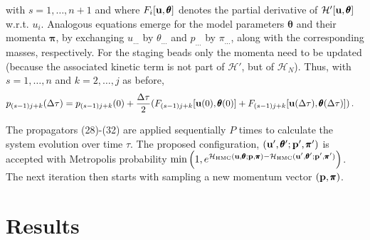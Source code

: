 \documentclass[11pt]{article}
\newcommand{\vc}[1]{{\bf #1 }}
\theoremstyle{definition}
\newcommand{\bt}{\pmb\theta}
\begin{document}
with $s=1,\dots,n+1$ and where $F_i[\vc u,{\pmb\theta}]$ denotes the partial derivative of $\mathcal H'[\vc u,{\pmb\theta}]$ w.r.t. $u_i$.
Analogous equations emerge for the model parameters $\bt$ and their momenta ${\pmb\pi}$, by exchanging $u_{…}$ by $\theta_{…}$ and $p_{…}$ by $\pi_{…}$, along with the corresponding masses, respectively. 
For the staging beads
only the momenta need to be updated (because the associated kinetic term is not part of $\mathcal H'$, but of $\mathcal H_N$).
Thus, with $s=1,\dots,n$ and $k=2,\dots,j$ as before,
\begin{align}
  p_{(s-1)j+k}(\Delta\tau)
  &=
  p_{(s-1)j+k}(0)
  +
  \frac{\Delta\tau}{2}
  (
  F_{(s-1)j+k}[\vc u(0),{\pmb\theta}(0)]
  +
  F_{(s-1)j+k}[\vc u(\Delta\tau),{\pmb\theta}(\Delta\tau)]
  )
  \,.
\end{align}
 
The propagators (28)-(32) are applied sequentially $P$ times to calculate the system evolution over time $\tau$. The proposed configuration, $(\vc u',\bt';\vc p',{\pmb\pi}')$ is accepted with Metropolis probability $  \min
  \left(
    1,
    e^{\mathcal{H}_{\mbox{\tiny HMC}}(\vc u,\bt;\vc p,{\pmb\pi}) - \mathcal{H}_{\mbox{\tiny HMC}}(\vc u',\bt';\vc p',{\pmb\pi}')}
  \right)$.
The next iteration then starts with sampling a new momentum vector $(\vc p,{\pmb\pi})$.

\section{Results}\label{numerical_results}
\end{document}

